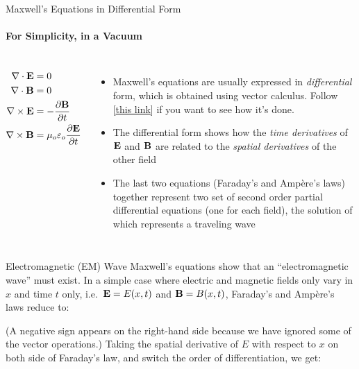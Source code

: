 \documentclass[12pt,aspectratio=169]{beamer}
\newcommand{\eq}[2]{
  \vspace{#1}{\Large\begin{displaymath}#2\end{displaymath}}
}
\begin{document}
\begin{frame}{Maxwell's Equations in Differential Form}
  \framesubtitle{For Simplicity, in a Vacuum}
  \begin{columns}

    {\Large
      \begin{align*}
        \nabla\cdot\mathbf{E} &= 0\\
        \nabla\cdot\mathbf{B} &= 0\\
        \nabla\times\mathbf{E} &=-\frac{\partial\mathbf{B}}{\partial t}\\
        \nabla\times\mathbf{B} &=\mu_o\varepsilon_o\frac{\partial\mathbf{E}}{\partial t}
      \end{align*}
    }

    \begin{itemize}
    \item Maxwell's equations are usually expressed in \emph{differential} form,
      which is obtained using vector calculus. Follow
      [\underline{\href{https://www.wikihow.com/Convert-Maxwell\%27s-Equations-into-Differential-Form}{this link}}] if you want to see how it's done.
    \item The differential form shows how the \emph{time derivatives} of
      $\mathbf{E}$ and $\mathbf{B}$ are related to the \emph{spatial derivatives}
      of the other field
    \item The last two equations (Faraday's and Amp\`{e}re's laws) together
      represent two set of second order partial differential equations (one for
      each field), the solution of which represents a traveling wave
    \end{itemize}
  \end{columns}
\end{frame}



\begin{frame}{Electromagnetic (EM) Wave}
  Maxwell's equations show that an ``electromagnetic wave'' must exist. In a
  simple case where electric and magnetic fields only vary in $x$ and time $t$
  only, i.e.\ $\mathbf{E}=E(x,t)$ and $\mathbf{B}=B(x,t)$, Faraday's and Amp\`{e}re's
  laws reduce to:

  \eq{-.1in}{
    \frac{\partial E}{\partial x}=-\frac{\partial B}{\partial t}
    \quad\quad
    \frac{\partial B}{\partial x}=
    -\mu_0\varepsilon_0\frac{\partial E}{\partial t}
  }

  (A negative sign appears on the right-hand side because we have ignored some
  of the vector operations.) Taking the spatial derivative of $E$ with respect
  to $x$ on both side of Faraday's law, and switch the order of
  differentiation, we get:

  \eq{-.2in}{
    \frac{\partial}{\partial x}
    \left(\frac{\partial E}{\partial x}\right)
    =-\frac{\partial}{\partial x}\left(\frac{\partial B}{\partial t}\right)
    \quad\rightarrow\quad
    \frac{\partial^2E}{\partial x^2}=
    -\frac{\partial}{\partial t}\left(\frac{\partial B}{\partial x}\right)
  }
\end{frame}
\end{document}
